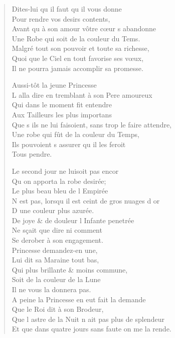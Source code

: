 \begin{verse}
\vin Dites-lui qu\textquotesingle{} il faut qu\textquotesingle{} il vous donne \\
\vin Pour rendre vos desirs contents, \\
Avant qu\textquotesingle{} à son amour vôtre cœur s\textquotesingle{} abandonne \\
Une Robe qui soit de la couleur du Tems. \\
Malgré tout son pouvoir et toute sa richesse, \\
Quoi que le Ciel en tout favorise ses vœux, \\
Il ne pourra jamais accomplir sa promesse.

\vin Aussi-tôt la jeune Princesse \\
L\textquotesingle{} alla dire en tremblant à son Pere amoureux \\
\vin Qui dans le moment fit entendre \\
\vin Aux Tailleurs les plus importans \\
Que s\textquotesingle{} ils ne lui faisoient, sans trop le faire attendre, \\
Une robe qui fût de la couleur du Temps, \\
Ils pouvoient s\textquotesingle{} assurer qu\textquotesingle{} il les feroit \\
\vin\vin Tous pendre.

\vin Le second jour ne luisoit pas encor \\
\vin Qu\textquotesingle{} on apporta la robe desirée; \\
\vin Le plus beau bleu de l\textquotesingle{} Empirée \\
N\textquotesingle{} est pas, lorsqu\textquotesingle{} il est ceint de gros nuages d\textquotesingle{} or \\
\vin D\textquotesingle{} une couleur plus azurée. \\
De joye \& de douleur l\textquotesingle{} Infante penetrée \\
\vin Ne sçait que dire ni comment \\
\vin Se derober à son engagement. \\
\vin Princesse demandez-en une, \\
\vin Lui dit sa Maraine tout bas, \\
\vin Qui plus brillante \& moins commune, \\
\vin Soit de la couleur de la Lune \\
\vin Il ne vous la donnera pas. \\
A peine la Princesse en eut fait la demande \\
\vin Que le Roi dit à son Brodeur, \\
Que l\textquotesingle{} astre de la Nuit n\textquotesingle{} ait pas plus de splendeur \\
Et que dans quatre jours sans faute on me la rende.


\end{verse}
